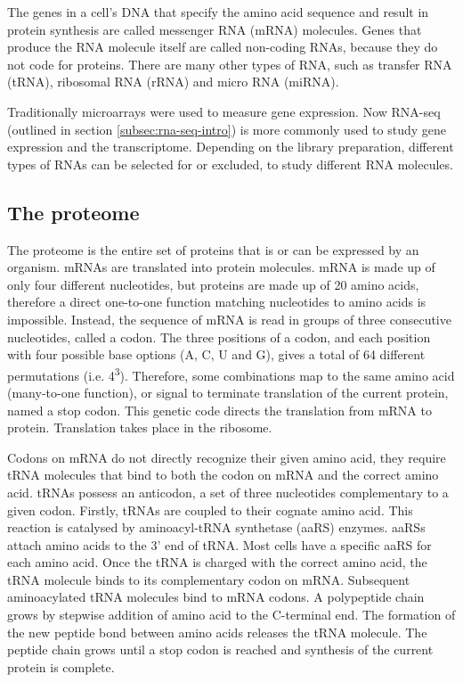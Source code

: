 The genes in a cell's DNA that specify the amino acid sequence and result in protein synthesis are called messenger RNA (mRNA) molecules.
Genes that produce the RNA molecule itself are called non-coding RNAs, because they do not code for proteins.
There are many other types of RNA, such as transfer RNA (tRNA), ribosomal RNA (rRNA) and micro RNA (miRNA).

Traditionally microarrays were used to measure gene expression.
Now RNA-seq (outlined in section  \ref{subsec:rna-seq-intro}) is more commonly used to study gene expression and the transcriptome.
Depending on the library preparation, different types of RNAs can be selected for or excluded, to study different RNA molecules.

\subsection{The proteome}\label{subsec:translation}
The proteome is the entire set of proteins that is or can be expressed by an organism.
mRNAs are translated into protein molecules.
mRNA is made up of only four different nucleotides, but proteins are made up of 20 amino acids, therefore a direct one-to-one function matching nucleotides to amino acids is impossible.
Instead, the sequence of mRNA is read in groups of three consecutive nucleotides, called a codon.
The three positions of a codon, and each position with four possible base options (A, C, U and G), gives a total of 64 different permutations (i.e. 4\textsuperscript{3}).
Therefore, some combinations map to the same amino acid (many-to-one function), or signal to terminate translation of the current protein, named a stop codon.
This genetic code directs the translation from mRNA to protein.
Translation takes place in the ribosome.

Codons on mRNA do not directly recognize their given amino acid, they require tRNA molecules that bind to both the codon on mRNA and the correct amino acid.
tRNAs possess an anticodon, a set of three nucleotides complementary to a given codon.
Firstly, tRNAs are coupled to their cognate amino acid.
This reaction is catalysed by aminoacyl-tRNA synthetase (aaRS) enzymes.
aaRSs attach amino acids to the 3' end of tRNA.
Most cells have a specific aaRS for each amino acid.
Once the tRNA is charged with the correct amino acid, the tRNA molecule binds to its complementary codon on mRNA\@.
Subsequent aminoacylated tRNA molecules bind to mRNA codons.
A polypeptide chain grows by stepwise addition of amino acid to the C-terminal end.
The formation of the new peptide bond between amino acids releases the tRNA molecule.
The peptide chain grows until a stop codon is reached and synthesis of the current protein is complete.

